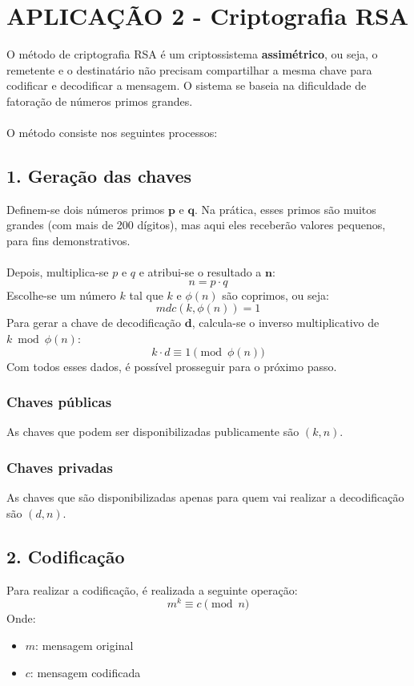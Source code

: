 \section*{APLICAÇÃO 2 - Criptografia RSA}
O método de criptografia RSA é um criptossistema \textbf{assimétrico}, ou seja, o remetente e o destinatário não precisam compartilhar a mesma chave para codificar e decodificar a mensagem. O sistema se baseia na dificuldade de fatoração de números primos grandes.\\\\
O método consiste nos seguintes processos:

\subsection*{1. Geração das chaves}
Definem-se dois números primos $\mathbf{p}$ e $\mathbf{q}$. Na prática, esses primos são muitos grandes (com mais de 200 dígitos), mas aqui eles receberão valores pequenos, para fins demonstrativos.\\\\
Depois, multiplica-se $p$ e $q$ e atribui-se o resultado a $\mathbf{n}$:
\[
    n = p \cdot q
\]
Escolhe-se um número $k$ tal que $k$ e $\phi(n)$ são coprimos, ou seja:
\[
    mdc(k, \phi(n)) = 1
\]
Para gerar a chave de decodificação $\mathbf{d}$, calcula-se o inverso multiplicativo de $k \bmod \phi(n)$:
\[
    k \cdot d \equiv 1 \pmod{\phi(n)}
\]
Com todos esses dados, é possível prosseguir para o próximo passo.

\vspace{24pt}
\subsubsection*{Chaves públicas}
As chaves que podem ser disponibilizadas publicamente são $(k,n)$.

\subsubsection*{Chaves privadas}
As chaves que são disponibilizadas apenas para quem vai realizar a decodificação são $(d,n)$.

\subsection*{2. Codificação}
Para realizar a codificação, é realizada a seguinte operação:
\[
    m^{k} \equiv c \pmod {n}
\]
Onde:
\begin{itemize}
    \item $m$: mensagem original
    \item $c$: mensagem codificada
\end{itemize}

